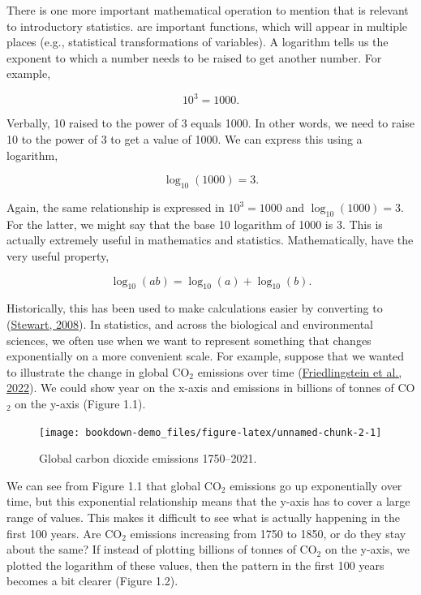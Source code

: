 \documentclass[
  openany]{krantz}
\begin{document}
There is one more important mathematical operation to mention that is relevant to introductory statistics.
 are important functions, which will appear in multiple places (e.g., statistical transformations of variables).
A logarithm tells us the exponent to which a number needs to be raised to get another number.
For example,

\[10^{3} = 1000.\]

Verbally, 10 raised to the power of 3 equals 1000.
In other words, we need to raise 10 to the power of 3 to get a value of 1000.
We can express this using a logarithm,

\[\log_{10}\left(1000\right) = 3.\]

Again, the same relationship is expressed in \(10^{3} = 1000\) and \(\log_{10}(1000) = 3\).
For the latter, we might say that the base 10 logarithm of 1000 is 3.
This is actually extremely useful in mathematics and statistics.
Mathematically,  have the very useful property,

\[\log_{10}(ab) = \log_{10}(a) + \log_{10}(b).\]

Historically, this has been used to make calculations easier by converting  to  (\protect\hyperlink{ref-Stewart2008}{Stewart, 2008}).
In statistics, and across the biological and environmental sciences, we often use  when we want to represent something that changes exponentially on a more convenient scale.
For example, suppose that we wanted to illustrate the change in global CO\(_{2}\) emissions over time (\protect\hyperlink{ref-Friedlingstein2022}{Friedlingstein et al., 2022}).
We could show year on the x-axis and emissions in billions of tonnes of CO\(_{2}\) on the y-axis (Figure 1.1).

\begin{figure}
\texttt{[image: bookdown-demo\_files/figure-latex/unnamed-chunk-2-1]} \caption{Global carbon dioxide emissions 1750--2021.}\label{fig:unnamed-chunk-2}
\end{figure}

We can see from Figure 1.1 that global CO\(_{2}\) emissions go up exponentially over time, but this exponential relationship means that the y-axis has to cover a large range of values.
This makes it difficult to see what is actually happening in the first 100 years.
Are CO\(_{2}\) emissions increasing from 1750 to 1850, or do they stay about the same?
If instead of plotting billions of tonnes of CO\(_{2}\) on the y-axis, we plotted the logarithm of these values, then the pattern in the first 100 years becomes a bit clearer (Figure 1.2).
\end{document}
